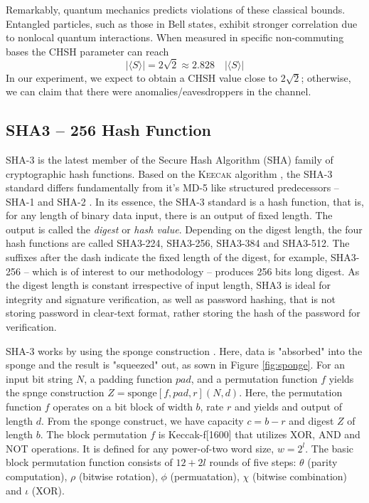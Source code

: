 \documentclass{article}
\begin{document}
Remarkably, quantum mechanics predicts violations of these classical bounds. Entangled particles, such as those in Bell states, exhibit stronger correlation due to nonlocal quantum interactions. When measured in specific non-commuting bases the CHSH parameter can reach \[
    \left| \langle S \rangle \right| = 2\sqrt{2} \approx 2.828 \quad \left| \langle S \rangle \right|
\]
In our experiment, we expect to obtain a CHSH value close to \( 2\sqrt{2} \); otherwise, we can claim that there were anomalies/eavesdroppers in the channel.
\subsection{SHA3 -- 256 Hash Function}
\label{sec:sha3}
SHA-3 is the latest member \cite{nistHashFunctions} of the Secure Hash Algorithm (SHA) family of cryptographic hash functions. Based on the K\textsc{eecak} algorithm \cite{Bbbbbbb2011}, the SHA-3 standard differs fundamentally from it's MD-5 \cite{rivest1992md5} like structured predecessors -- SHA-1 and SHA-2 \cite{penard2008secure}. In its essence, the SHA-3 standard is a hash function, that is, for any length of binary data input, there is an output of fixed length. The output is called the \textit{digest} or \textit{hash value}. Depending on the digest length, the four hash functions are called SHA3-224, SHA3-256, SHA3-384 and SHA3-512. The suffixes after the dash indicate the fixed length of the digest, for example, SHA3-256 -- which is of interest to our methodology -- produces 256 bits long digest. As the digest length is constant irrespective of input length, SHA3 is ideal for integrity and signature verification, as well as password hashing, that is not storing password in clear-text format, rather storing the hash of the password for verification.

SHA-3 works by using the sponge construction \cite{keccakKeccakTeam}. Here, data is "absorbed" into the sponge and the result is "squeezed" out, as sown in Figure \ref{fig:sponge}. For an input bit string $N$, a padding function $pad$, and a permutation function $f$ yields the spnge construction $Z=\text{sponge}[f,pad,r](N,d)$. Here, the permutation function $f$ operates on a bit block of width $b$, rate $r$ and yields and output of length $d$. From the sponge construct, we have capacity $c=b-r$ and digest $Z$ of length $b$. The block permutation $f$ is Keccak-f[1600] that utilizes XOR, AND and NOT operations. It is defined for any power-of-two word size, $w=2^l$. The basic block permutation function consists of $12+2l$ rounds of five steps: $\theta$ (parity computation), $\rho$ (bitwise rotation), $\phi$ (permuatation), $\chi$ (bitwise combination) and $\iota$ (XOR).
\end{document}
